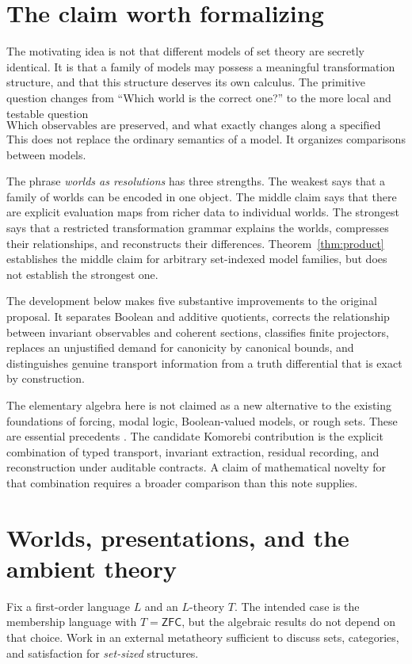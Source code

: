 \documentclass[11pt,letterpaper]{article}
\theoremstyle{definition}
\newcommand{\ZFC}{\mathsf{ZFC}}
\begin{document}
\section{The claim worth formalizing}
The motivating idea is not that different models of set theory are secretly identical. It is that a family of models may possess a meaningful transformation structure, and that this structure deserves its own calculus. The primitive question changes from ``Which world is the correct one?'' to the more local and testable question
\[
\text{Which observables are preserved, and what exactly changes along a specified transformation?}
\]
This does not replace the ordinary semantics of a model. It organizes comparisons between models.

The phrase \emph{worlds as resolutions} has three strengths. The weakest says that a family of worlds can be encoded in one object. The middle claim says that there are explicit evaluation maps from richer data to individual worlds. The strongest says that a restricted transformation grammar explains the worlds, compresses their relationships, and reconstructs their differences. Theorem~\ref{thm:product} establishes the middle claim for arbitrary set-indexed model families, but does not establish the strongest one.

The development below makes five substantive improvements to the original proposal. It separates Boolean and additive quotients, corrects the relationship between invariant observables and coherent sections, classifies finite projectors, replaces an unjustified demand for canonicity by canonical bounds, and distinguishes genuine transport information from a truth differential that is exact by construction.

The elementary algebra here is not claimed as a new alternative to the existing foundations of forcing, modal logic, Boolean-valued models, or rough sets. These are essential precedents \cite{hamkinslowe,hamkinsseabold,pawlak}. The candidate Komorebi contribution is the explicit combination of typed transport, invariant extraction, residual recording, and reconstruction under auditable contracts. A claim of mathematical novelty for that combination requires a broader comparison than this note supplies.

\section{Worlds, presentations, and the ambient theory}\label{sec:worlds}
Fix a first-order language $L$ and an $L$-theory $T$. The intended case is the membership language with $T=\ZFC$, but the algebraic results do not depend on that choice. Work in an external metatheory sufficient to discuss sets, categories, and satisfaction for \emph{set-sized} structures.
\end{document}
